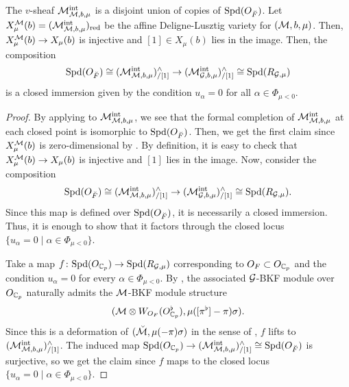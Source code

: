 \documentclass[12pt,reqno]{amsart}
\begin{document}
\begin{lem} \label{lem:unramified_CM_points}
    The $v$-sheaf ${\mathcal{M}}^{\operatorname{int}}_{{\mathcal{M}}, b, \mu}$ is a disjoint union of copies of ${\operatorname{Spd}}(O_{\breve{F}})$. Let $X_\mu^{{\mathcal{M}}}(b) = ({\mathcal{M}}^{\operatorname{int}}_{{\mathcal{M}}, b, \mu})_{\operatorname{red}}$ be the affine Deligne-Lusztig variety for $({\mathcal{M}}, b, \mu)$. Then, $X^{{\mathcal{M}}}_\mu(b) \to X_\mu(b)$ is injective and $[1] \in X_\mu(b)$ lies in the image. Then, the composition
    \[
        {\operatorname{Spd}}(O_{\breve{F}}) \cong ({\mathcal{M}}^{\operatorname{int}}_{{\mathcal{M}}, b, \mu})^\wedge_{/[1]} \to ({\mathcal{M}}^{\operatorname{int}}_{{\mathcal{G}}, b, \mu})^\wedge_{/[1]} \cong {\operatorname{Spd}}(R_{{\mathcal{G}}, \mu})
    \]
    is a closed immersion given by the condition $u_\alpha = 0$ for all $\alpha \in \Phi_{\mu < 0}$. 
\end{lem}
\begin{proof}
    By applying \cite[Theorem 5.3.5]{Ito25a} to ${\mathcal{M}}^{\operatorname{int}}_{{\mathcal{M}}, b, \mu}$, we see that the formal completion of ${\mathcal{M}}^{\operatorname{int}}_{{\mathcal{M}}, b, \mu}$ at each closed point is isomorphic to ${\operatorname{Spd}}(O_{\breve{F}})$. Then, we get the first claim since $X^{{\mathcal{M}}}_\mu(b)$ is zero-dimensional by \cite[Theorem 3.1]{Zhu17}. By definition, it is easy to check that $X^{{\mathcal{M}}}_\mu(b) \to X_\mu(b)$ is injective and $[1]$ lies in the image. Now, consider the composition
    \[
        {\operatorname{Spd}}(O_{\breve{F}}) \cong ({\mathcal{M}}^{\operatorname{int}}_{{\mathcal{M}}, b, \mu})^\wedge_{/[1]} \to ({\mathcal{M}}^{\operatorname{int}}_{{\mathcal{G}}, b, \mu})^\wedge_{/[1]} \cong {\operatorname{Spd}}(R_{{\mathcal{G}}, \mu}). 
    \]
    Since this map is defined over ${\operatorname{Spd}}(O_{\breve{F}})$, it is necessarily a closed immersion. Thus, it is enough to show that it factors through the closed locus $\{ u_\alpha = 0 \mid \alpha \in \Phi_{\mu < 0} \}$.  

    Take a map $f \colon {\operatorname{Spd}}(O_{\mathbb{C}_p}) \to {\operatorname{Spd}}(R_{{\mathcal{G}}, \mu})$ corresponding to $O_F \subset O_{\mathbb{C}_p}$ and the condition $u_\alpha = 0$ for every $\alpha \in \Phi_{\mu < 0}$. By , the associated ${\mathcal{G}}$-BKF module over $O_{\mathbb{C}_p}$ naturally admits the ${\mathcal{M}}$-BKF module structure
    \[
        ({\mathcal{M}} \otimes W_{O_F}(O_{\mathbb{C}_p}^\flat), \mu([\pi^\flat] - \pi) \sigma).
    \] 
    Since this is a deformation of $({\mathcal{\breve{M}}}, \mu(-\pi)\sigma)$ in the sense of \cite{Ito25a}, $f$ lifts to $({\mathcal{M}}^{\operatorname{int}}_{{\mathcal{M}}, b, \mu})^\wedge_{/[1]}$. The induced map ${\operatorname{Spd}}(O_{\mathbb{C}_p}) \to ({\mathcal{M}}^{\operatorname{int}}_{{\mathcal{M}}, b, \mu})^\wedge_{/[1]} \cong {\operatorname{Spd}}(O_{\breve{F}})$ is surjective, so we get the claim since $f$ maps to the closed locus $\{ u_\alpha = 0 \mid \alpha \in \Phi_{\mu < 0} \}$. 
\end{proof}
\end{document}

